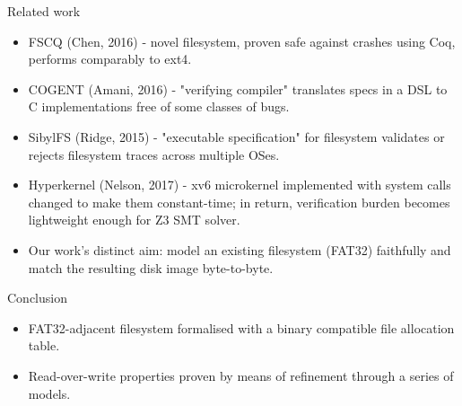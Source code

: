 \documentclass{beamer}
\begin{document}
\begin{frame}{Related work}
  \begin{itemize}
  \item FSCQ (Chen, 2016) - novel filesystem, proven
    safe against crashes using Coq, performs comparably to
    ext4.
  \item COGENT (Amani, 2016) - "verifying compiler" translates specs
    in a DSL to C implementations free of some classes of bugs.
  \item SibylFS (Ridge, 2015) - "executable specification" for
    filesystem validates or rejects filesystem traces across multiple
    OSes.
  \item Hyperkernel (Nelson, 2017) - xv6 microkernel implemented
    with system calls changed to make them constant-time; in return,
    verification burden becomes lightweight enough for Z3 SMT solver.
  \item Our work's distinct aim: model an existing filesystem (FAT32)
    faithfully and match the resulting disk image byte-to-byte.
  \end{itemize}
\end{frame}

\begin{frame}{Conclusion}
  \begin{itemize}
  \item FAT32-adjacent filesystem formalised with
    a binary compatible file allocation table.
  \item Read-over-write properties proven by means of refinement
    through a series of models.
  \end{itemize}
\end{frame}
\end{document}
